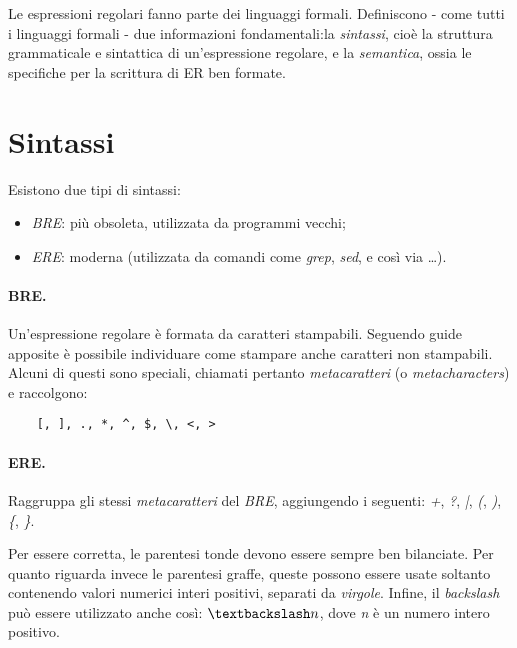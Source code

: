 Le espressioni regolari fanno parte dei linguaggi formali. Definiscono - come tutti i linguaggi formali - due informazioni fondamentali:la \textit{sintassi}, cioè la struttura grammaticale e sintattica di un'espressione regolare, e la \textit{semantica}, ossia le specifiche per la scrittura di ER ben formate.

\section{Sintassi}
Esistono due tipi di sintassi:
\begin{itemize}
	\item \textit{BRE}: più obsoleta, utilizzata da programmi vecchi;
	\item \textit{ERE}: moderna (utilizzata da comandi come \textit{grep}, \textit{sed}, e così via \ldots).
\end{itemize}
\paragraph{BRE.} Un'espressione regolare è formata da caratteri stampabili. Seguendo guide apposite è possibile individuare come stampare anche caratteri non stampabili. Alcuni di questi sono speciali, chiamati pertanto \textit{metacaratteri} (o \textit{metacharacters}) e raccolgono: 
\begin{lstlisting}
	[, ], ., *, ^, $, \, <, >
\end{lstlisting}

\paragraph{ERE.} Raggruppa gli stessi \textit{metacaratteri} del \textit{BRE}, aggiungendo i seguenti: \textit{+}, \textit{?}, \textit{|}, \textit{(}, \textit{)}, \textit{\{}, \textit{\}}. 

Per essere corretta, le parentesi tonde devono essere sempre ben bilanciate. Per quanto riguarda invece le parentesi graffe, queste possono essere usate soltanto contenendo valori numerici interi positivi, separati da \textit{virgole}. Infine, il \textit{backslash} può essere utilizzato anche così: $\textbackslash n$, dove \textit{n} è un numero intero positivo.

